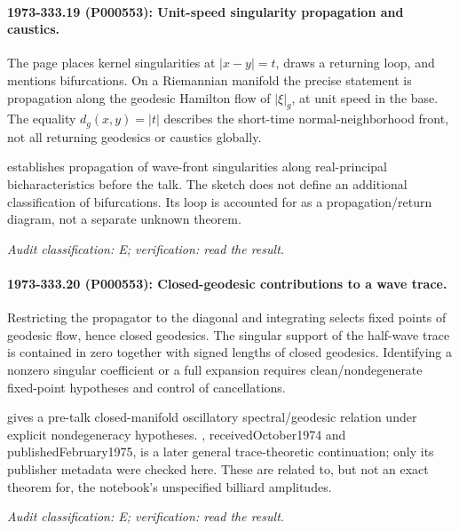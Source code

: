 \paragraph{1973-333.19 (P000553): Unit-speed singularity propagation and caustics.}
The page places kernel singularities at \(|x-y|=t\), draws a returning loop, and mentions bifurcations. On a Riemannian manifold the precise statement is propagation along the geodesic Hamilton flow of \(|\xi|_g\), at unit speed in the base. The equality \(d_g(x,y)=|t|\) describes the short-time normal-neighborhood front, not all returning geodesics or caustics globally.

\citet[Theorem6.1.1]{duistermaathormander1972fourierii} establishes propagation of wave-front singularities along real-principal bicharacteristics before the talk. The sketch does not define an additional classification of bifurcations. Its loop is accounted for as a propagation/return diagram, not a separate unknown theorem.

\emph{Audit classification: E; verification: read the result.}

\paragraph{1973-333.20 (P000553): Closed-geodesic contributions to a wave trace.}
Restricting the propagator to the diagonal and integrating selects fixed points of geodesic flow, hence closed geodesics. The singular support of the half-wave trace is contained in zero together with signed lengths of closed geodesics. Identifying a nonzero singular coefficient or a full expansion requires clean/nondegenerate fixed-point hypotheses and control of cancellations.

\citet[introduction and main theorem]{colindeverdiere1973geodesicsii} gives a pre-talk closed-manifold oscillatory spectral/geodesic relation under explicit nondegeneracy hypotheses. \citet{duistermaatguillemin1975spectrum}, receivedOctober1974 and publishedFebruary1975, is a later general trace-theoretic continuation; only its publisher metadata were checked here. These are related to, but not an exact theorem for, the notebook’s unspecified billiard amplitudes.

\emph{Audit classification: E; verification: read the result.}
